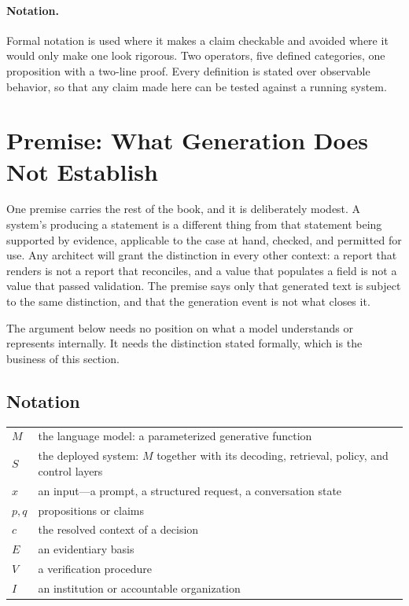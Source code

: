 \paragraph{Notation.} Formal notation is used where it makes a claim checkable
and avoided where it would only make one look rigorous. Two operators, five
defined categories, one proposition with a two-line proof. Every definition is
stated over observable behavior, so that any claim made here can be tested
against a running system.

\section{Premise: What Generation Does Not Establish}
\label{ch:epistemic-premise}
\label{sec:premise}

One premise carries the rest of the book, and it is deliberately modest. A
system's producing a statement is a different thing from that statement being
supported by evidence, applicable to the case at hand, checked, and permitted for
use. Any architect will grant the distinction in every other context: a report that
renders is not a report that reconciles, and a value that populates a field is not
a value that passed validation. The premise says only that generated text is
subject to the same distinction, and that the generation event is not what closes
it.

The argument below needs no position on what a model understands or represents
internally. It needs the distinction stated formally, which is the business of this
section.

\subsection{Notation}
\label{sec:notation}

\begin{center}
\begin{tabular}{@{}ll@{}}
\toprule
$M$ & the language model: a parameterized generative function \\
$S$ & the deployed system: $M$ together with its decoding, retrieval, policy,
      and control layers \\
$x$ & an input---a prompt, a structured request, a conversation state \\
$p, q$ & propositions or claims \\
$c$ & the resolved context of a decision \\
$E$ & an evidentiary basis \\
$V$ & a verification procedure \\
$I$ & an institution or accountable organization \\
\bottomrule
\end{tabular}
\end{center}

